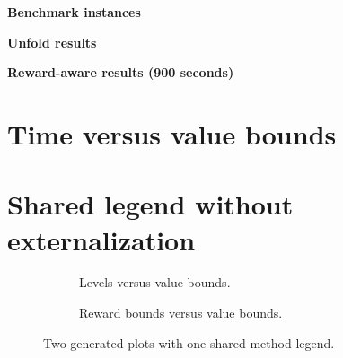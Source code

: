 \documentclass[fontsize=10pt,paper=b5,twoside,DIV=11,BCOR=9mm,
    headinclude=true,footinclude=false]{scrartcl}
\begin{document}
\textbf{Benchmark instances}\par\medskip
{\small\par}

\clearpage
\textbf{Unfold results}\par\medskip


\clearpage
\textbf{Reward-aware results (900 seconds)}\par\medskip


\clearpage
\setlength{\parskip}{1em}
\section*{Time versus value bounds}


\clearpage
\section*{Shared legend without externalization}
\begin{figure}[!ht]
  \centering
  \begin{subfigure}[t]{0.49\linewidth}
    \centering
    
    \caption{Levels versus value bounds.}
  \end{subfigure}
  \hfill
  \begin{subfigure}[t]{0.49\linewidth}
    \centering
    
    \caption{Reward bounds versus value bounds.}
  \end{subfigure}

  \medskip
  \makebox[\linewidth][c]{}
  \caption{Two generated plots with one shared method legend.}
\end{figure}
\end{document}
